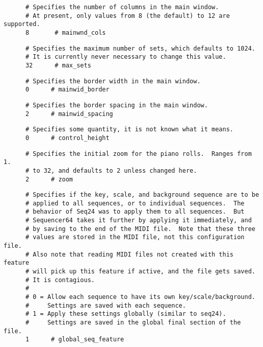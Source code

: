    \begin{verbatim}
      # Specifies the number of columns in the main window.
      # At present, only values from 8 (the default) to 12 are supported.
      8       # mainwnd_cols
   \end{verbatim}

   \begin{verbatim}
      # Specifies the maximum number of sets, which defaults to 1024.
      # It is currently never necessary to change this value.
      32      # max_sets
   \end{verbatim}

   \begin{verbatim}
      # Specifies the border width in the main window.
      0      # mainwid_border
   \end{verbatim}

   \begin{verbatim}
      # Specifies the border spacing in the main window.
      2      # mainwid_spacing
   \end{verbatim}

   \begin{verbatim}
      # Specifies some quantity, it is not known what it means.
      0      # control_height
   \end{verbatim}

   \begin{verbatim}
      # Specifies the initial zoom for the piano rolls.  Ranges from 1.
      # to 32, and defaults to 2 unless changed here.
      2      # zoom
   \end{verbatim}

   \begin{verbatim}
      # Specifies if the key, scale, and background sequence are to be
      # applied to all sequences, or to individual sequences.  The
      # behavior of Seq24 was to apply them to all sequences.  But
      # Sequencer64 takes it further by applying it immediately, and
      # by saving to the end of the MIDI file.  Note that these three
      # values are stored in the MIDI file, not this configuration file.
      # Also note that reading MIDI files not created with this feature
      # will pick up this feature if active, and the file gets saved.
      # It is contagious.
      #
      # 0 = Allow each sequence to have its own key/scale/background.
      #     Settings are saved with each sequence.
      # 1 = Apply these settings globally (similar to seq24).
      #     Settings are saved in the global final section of the file.
      1      # global_seq_feature
   \end{verbatim}

